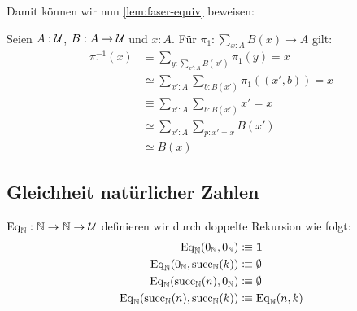 Damit können wir nun \cref{lem:faser-equiv} beweisen:

\begin{beweis}
  Seien $A:\mathcal{U}$, $B:A\to\mathcal{U}$ und $x:A$. Für $\pi_1:\sum_{x:A}B(x)\to A$ gilt:
  \begin{align*}
    \pi_1^{-1}(x)&\equiv \sum_{y:\sum_{x':A}B(x')}\pi_1(y)=x\\
                 &\simeq \sum_{x':A}\sum_{b:B(x')}\pi_1((x',b))=x \\
                 &\equiv \sum_{x':A}\sum_{b:B(x')} x'=x \\
                 &\simeq \sum_{x':A}\sum_{p:x'=x}B(x')\\
                 &\simeq B(x)
  \end{align*}
\end{beweis}


\subsection{Gleichheit natürlicher Zahlen}
\label{sec:zahlen-gleichheit}
\begin{definition}
  $\mathrm{Eq}_{\mathbb{N}}:\mathbb{N}\to\mathbb{N}\to\mathcal{U}$ definieren wir durch doppelte Rekursion wie folgt:
  \begin{align*}
    \mathrm{Eq}_{\mathbb{N}}(0_{\mathbb{N}},    0_{\mathbb{N}})     &\vcentcolon\mspace{-1.2mu}\equiv\mathbf{1} \\
    \mathrm{Eq}_{\mathbb{N}}(0_{\mathbb{N}},    \mathrm{succ}_{\mathbb{N}}(k)) &\vcentcolon\mspace{-1.2mu}\equiv\emptyset \\
    \mathrm{Eq}_{\mathbb{N}}(\mathrm{succ}_{\mathbb{N}}(n),0_{\mathbb{N}})     &\vcentcolon\mspace{-1.2mu}\equiv\emptyset \\
    \mathrm{Eq}_{\mathbb{N}}(\mathrm{succ}_{\mathbb{N}}(n),\mathrm{succ}_{\mathbb{N}}(k)) &\vcentcolon\mspace{-1.2mu}\equiv\mathrm{Eq}_{\mathbb{N}}(n,k) 
  \end{align*}
\end{definition}

